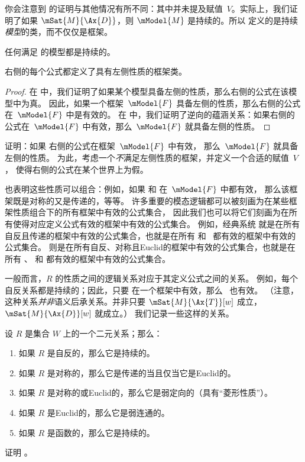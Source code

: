 \documentclass[../../../include/open-logic-section]{subfiles}
\begin{document}
你会注意到  的证明与其他情况有所不同：其中并未提及赋值~$V$。实际上，我们证明了如果 $\mSat{M}{\Ax{D}}$，则 $\mModel{M}$ 是持续的。所以  定义的是持续\emph{模型}的类，而不仅仅是框架。

\begin{cor}
  任何满足  的模型都是持续的。
\end{cor}

\begin{cor}
 右侧的每个公式都定义了具有左侧性质的框架类。
\end{cor}

\begin{proof}
在  中，我们证明了如果某个模型具备左侧的性质，那么右侧的公式在该模型中为真。
因此，如果一个框架~$\mModel{F}$ 具备左侧的性质，那么右侧的公式在~$\mModel{F}$ 中是有效的。
在  中，我们证明了逆向的蕴涵关系：如果右侧的公式在~$\mModel{F}$ 中有效，那么~$\mModel{F}$ 就具备左侧的性质。
\end{proof}

\begin{prob}
证明：如果  右侧的公式在框架~$\mModel{F}$ 中有效，
那么~$\mModel{F}$ 就具备左侧的性质。
为此，考虑一个\emph{不}满足左侧性质的框架，并定义一个合适的赋值~$V$，
使得右侧的公式在某个世界上为假。
\end{prob}

也表明这些性质可以组合：例如，如果  和  在~$\mModel{F}$ 中都有效，
那么该框架既是对称的又是传递的，等等。
许多重要的模态逻辑都可以被刻画为在某些框架性质组合下的所有框架中有效的公式集合，
因此我们也可以将它们刻画为在所有使得对应定义公式有效的框架中有效的公式集合。
例如，经典系统  就是在所有自反且传递的框架中有效的公式集合，也就是在所有  和~ 都有效的框架中有效的公式集合。
 则是在所有自反、对称且Euclid的框架中有效的公式集合，也就是在所有 、 和  都有效的框架中有效的公式集合。

一般而言，$R$ 的性质之间的逻辑关系对应于其定义公式之间的关系。
例如，每个自反关系都是持续的；因此，只要  在一个框架中有效，那么~ 也有效。
（注意，这种关系\emph{并非}语义后承关系。并非只要 $\mSat{M}{\Ax{T}}[w]$ 成立，$\mSat{M}{\Ax{D}}[w]$ 就成立。）
我们记录一些这样的关系。

\begin{prop}
  设 $R$ 是集合 $W$ 上的一个二元关系；那么：
  \begin{enumerate}
  \item 如果 $R$ 是自反的，那么它是持续的。
  \item 如果 $R$ 是对称的，那么它是传递的当且仅当它是Euclid的。
  \item 如果 $R$ 是对称的或Euclid的，那么它是弱定向的（具有“菱形性质”）。
  \item 如果 $R$ 是Euclid的，那么它是弱连通的。
  \item 如果 $R$ 是函数的，那么它是持续的。
  \end{enumerate}
\end{prop}

\begin{prob}
  证明 。
\end{prob}
\end{document}
